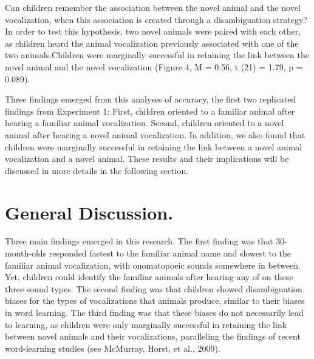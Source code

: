 \documentclass[english,floatsintext,man]{apa6}
\theoremstyle{definition}
\theoremstyle{definition}
\theoremstyle{definition}
\theoremstyle{remark}
\begin{document}
Can children remember the association between the novel animal and the
novel vocalization, when this association is created through a
disambiguation strategy? In order to test this hypothesis, two novel
animals were paired with each other, as children heard the animal
vocalization previously associated with one of the two animals.Children
were marginally successful in retaining the link between the novel
animal and the novel vocalization (Figure 4, M = 0.56, t (21) = 1.79, p
= 0.089).

Three findings emerged from this analyses of accuracy, the first two
replicated findings from Experiment 1: First, children oriented to a
familiar animal after hearing a familiar animal vocalization. Second,
children oriented to a novel animal after hearing a novel animal
vocalization. In addition, we also found that children were marginally
successful in retaining the link between a novel animal vocalization and
a novel animal. These results and their implications will be discussed
in more details in the following section.

\section{General Discussion.}\label{general-discussion.}

Three main findings emerged in this research. The first finding was that
30-month-olds responded fastest to the familiar animal name and slowest
to the familiar animal vocalization, with onomatopoeic sounds somewhere
in between. Yet, children could identify the familiar animals after
hearing any of on these three sound types. The second finding was that
children showed disambiguation biases for the types of vocalizations
that animals produce, similar to their biases in word learning. The
third finding was that these biases do not necessarily lead to learning,
as children were only marginally successful in retaining the link
between novel animals and their vocalizations, paralleling the findings
of recent word-learning studies (see McMurray, Horst, et al., 2009).
\end{document}
